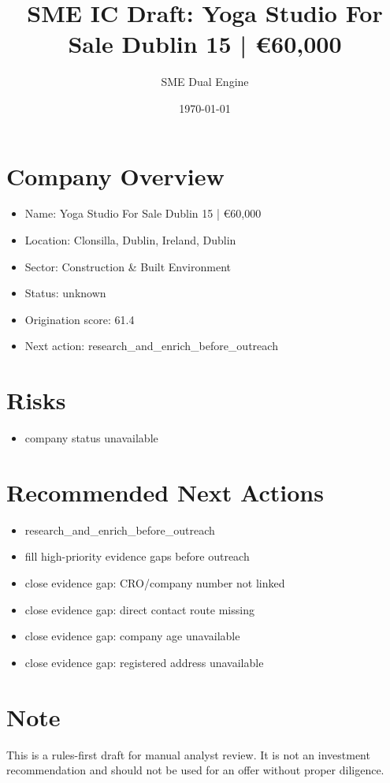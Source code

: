 \documentclass[11pt,a4paper]{article}
\title{SME IC Draft: Yoga Studio For Sale Dublin 15 | €60,000}
\author{SME Dual Engine}
\date{\today}
\begin{document}
\maketitle
\section*{Company Overview}
\begin{itemize}[leftmargin=1.4em]
\item Name: Yoga Studio For Sale Dublin 15 | €60,000
\item Location: Clonsilla, Dublin, Ireland, Dublin
\item Sector: Construction \& Built Environment
\item Status: unknown
\item Origination score: 61.4
\item Next action: research\_and\_enrich\_before\_outreach
\end{itemize}
\section*{Risks}
\begin{itemize}[leftmargin=1.4em]
\item company status unavailable
\end{itemize}
\section*{Recommended Next Actions}
\begin{itemize}[leftmargin=1.4em]
\item research\_and\_enrich\_before\_outreach
\item fill high-priority evidence gaps before outreach
\item close evidence gap: CRO/company number not linked
\item close evidence gap: direct contact route missing
\item close evidence gap: company age unavailable
\item close evidence gap: registered address unavailable
\end{itemize}
\section*{Note}
This is a rules-first draft for manual analyst review. It is not an investment
recommendation and should not be used for an offer without proper diligence.
\end{document}
